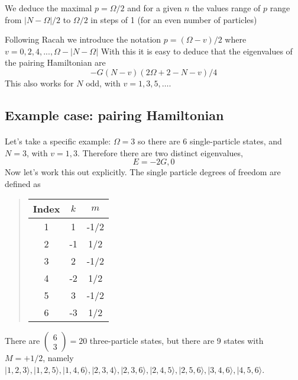 We deduce the maximal $p = \Omega/2$ and for a given $n$ the 
values range of $p$ range from $|N-\Omega|/2$ to $\Omega/2$ in steps of 1 
(for an even number of particles) 

Following Racah we introduce the notation
$p = (\Omega - v)/2$
where $v = 0, 2, 4,..., \Omega - |N-\Omega|$ 
With this it is easy to deduce that the eigenvalues of the pairing Hamiltonian are
\[
-G(N-v)(2\Omega +2-N-v)/4
\]
This also works for $N$ odd, with $v= 1,3,5, \dots$.



\subsection*{Example case: pairing Hamiltonian}

\paragraph{}

Let's take a specific example: $\Omega = 3$ so there are 6 single-particle states, 
and $N = 3$, with $v= 1,3$. Therefore there are two distinct eigenvalues, 
\[
E = -2G, 0
\]
Now let's work this out explicitly. The single particle degrees of freedom are defined as


\begin{quote}
\begin{tabular}{ccc}
\hline
\multicolumn{1}{c}{ Index } & \multicolumn{1}{c}{ $k$ } & \multicolumn{1}{c}{ $m$ } \\
\hline
1     & 1   & -1/2 \\
2     & -1  & 1/2  \\
3     & 2   & -1/2 \\
4     & -2  & 1/2  \\
5     & 3   & -1/2 \\
6     & -3  & 1/2  \\
\hline
\end{tabular}
\end{quote}

\noindent
 There are  $\left( \begin{array}{c}6 \\ 3 \end{array} \right) = 20$ three-particle states, but there 
are 9 states with $M = +1/2$, namely
$| 1,2,3 \rangle, |1,2,5\rangle, | 1,4,6 \rangle, | 2,3,4 \rangle, |2,3,6 \rangle, | 2,4,5 \rangle, | 2, 5, 6 \rangle, |3,4,6 \rangle, | 4,5,6 \rangle$.



